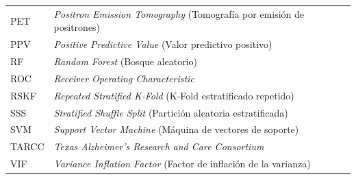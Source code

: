 \begin{longtable}{@{}p{2cm}p{13cm}@{}}
PET     & \textit{Positron Emission Tomography} (Tomografía por emisión de positrones) \\[4pt]
PPV     & \textit{Positive Predictive Value} (Valor predictivo positivo) \\[4pt]
RF      & \textit{Random Forest} (Bosque aleatorio) \\[4pt]
ROC     & \textit{Receiver Operating Characteristic} \\[4pt]
RSKF    & \textit{Repeated Stratified K-Fold} (K-Fold estratificado repetido) \\[4pt]
SSS     & \textit{Stratified Shuffle Split} (Partición aleatoria estratificada) \\[4pt]
SVM     & \textit{Support Vector Machine} (Máquina de vectores de soporte) \\[4pt]
TARCC   & \textit{Texas Alzheimer's Research and Care Consortium} \\[4pt]
VIF     & \textit{Variance Inflation Factor} (Factor de inflación de la varianza) \\[4pt]
\end{longtable}
